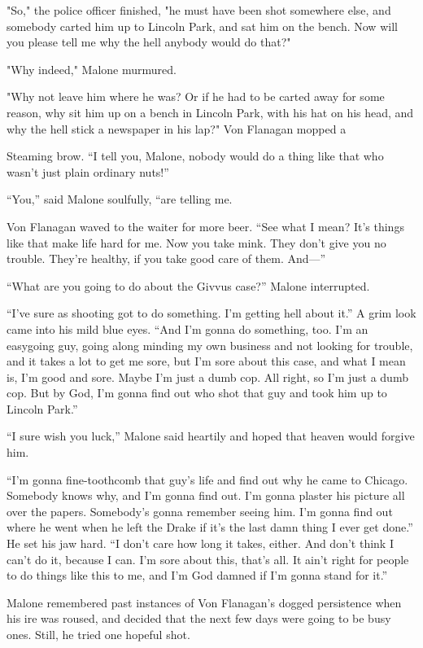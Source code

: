 \documentclass{novel}
\begin{document}
"So," the police officer finished, "he must have been shot somewhere else, and somebody carted him up to Lincoln Park, and sat him on the bench. Now will you please tell me why the hell anybody would do that?"

"Why indeed," Malone murmured.

"Why not leave him where he was? Or if he had to be carted away for some reason, why sit him up on a bench in Lincoln Park, with his hat on his head, and why the hell stick a newspaper in his lap?" Von Flanagan mopped a

Steaming brow. “I tell you, Malone, nobody would do a thing like that who wasn’t just plain ordinary nuts!”

“You,” said Malone soulfully, “are telling me.

Von Flanagan waved to the waiter for more beer. “See what I mean? It’s things like that make life hard for me. Now you take mink. They don’t give you no trouble. They’re healthy, if you take good care of them. And—”

“What are you going to do about the Givvus case?” Malone interrupted.

“I’ve sure as shooting got to do something. I’m getting hell about it.” A grim look came into his mild blue eyes. “And I’m gonna do something, too. I’m an easygoing guy, going along minding my own business and not looking for trouble, and it takes a lot to get me sore, but I’m sore about this case, and what I mean is, I’m good and sore. Maybe I’m just a dumb cop. All right, so I’m just a dumb cop. But by God, I’m gonna find out who shot that guy and took him up to Lincoln Park.”

“I sure wish you luck,” Malone said heartily and hoped that heaven would forgive him.

“I’m gonna fine-toothcomb that guy’s life and find out why he came to Chicago. Somebody knows why, and I’m gonna find out. I’m gonna plaster his picture all over the papers. Somebody’s gonna remember seeing him. I’m gonna find out where he went when he left the Drake if it’s the last damn thing I ever get done.” He set his jaw hard. “I don’t care how long it takes, either. And don’t think I can’t do it, because I can. I’m sore about this, that’s all. It ain’t right for people to do things like this to me, and I’m God damned if I’m gonna stand for it.”

Malone remembered past instances of Von Flanagan’s dogged persistence when his ire was roused, and decided that the next few days were going to be busy ones. Still, he tried one hopeful shot.
\end{document}
